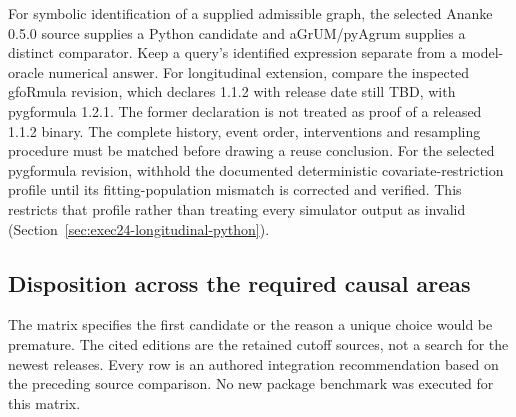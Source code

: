 For symbolic identification of a supplied admissible graph, the selected
Ananke 0.5.0 source supplies a Python candidate and aGrUM/pyAgrum supplies
a distinct comparator. Keep a query's identified expression separate from
a model-oracle numerical answer. For longitudinal extension, compare the
inspected gfoRmula revision, which declares 1.1.2 with release date still
TBD, with pygformula 1.2.1. The former declaration is not treated as proof
of a released 1.1.2 binary. The complete history, event order, interventions
and resampling procedure must be matched before drawing a reuse conclusion.
For the selected pygformula revision, withhold the documented deterministic
covariate-restriction profile until its fitting-population mismatch is corrected
and verified. This restricts that profile rather than treating every simulator
output as invalid (Section~\ref{sec:exec24-longitudinal-python}).
\citep{exec24_ananke_source,exec19_cxx_identification_source,
exec24_agrum_source,exec20_gformula_reuse,exec24_longpy_pygformula_source}

\subsection{Disposition across the required causal areas}
The matrix specifies the first candidate or the reason a unique choice
would be premature. The cited editions are the retained cutoff sources,
not a search for the newest releases. Every row is an authored integration
recommendation based on the preceding source comparison. No new package
benchmark was executed for this matrix.

